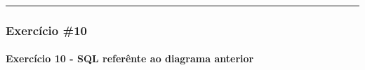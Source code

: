 \documentclass[
]{book}
\makeatletter
\newcommand*\pandocbounded[1]{%
  \sbox\pandoc@box{#1}%
  \Gscale@div\@tempa{\textheight}{\dimexpr\ht\pandoc@box+\dp\pandoc@box\relax}%
  \Gscale@div\@tempb{\linewidth}{\wd\pandoc@box}%
  \ifdim\@tempb\p@<\@tempa\p@\let\@tempa\@tempb\fi%
  \ifdim\@tempa\p@<\p@\scalebox{\@tempa}{\usebox\pandoc@box}%
  \else\usebox{\pandoc@box}%
  \fi%
}
\makeatother
\begin{document}
\begin{center}\rule{0.5\linewidth}{0.5pt}\end{center}

\subsubsection{Exercício \#10}\label{exercuxedcio-10-1}

\pandocbounded{}

\paragraph{Exercício 10 - SQL referênte ao diagrama anterior}\label{exercuxedcio-10---sql-referuxeante-ao-diagrama-anterior-1}
\end{document}
